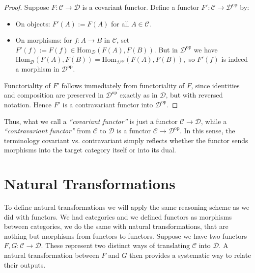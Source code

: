 \begin{proof}
Suppose $F : \mathcal{C} \to \mathcal{D}$ is a covariant functor.  
Define a functor $F' : \mathcal{C} \to \mathcal{D}^{\mathrm{op}}$ by:
\begin{itemize}
  \item On objects: $F'(A) := F(A)$ for all $A \in \mathcal{C}$.
  \item On morphisms: for $f : A \to B$ in $\mathcal{C}$, set
  \(
  F'(f) := F(f) \in \mathrm{Hom}_{\mathcal{D}}(F(A),F(B)).
  \)
  But in $\mathcal{D}^{\mathrm{op}}$ we have
  \(
  \mathrm{Hom}_{\mathcal{D}}(F(A),F(B)) = \mathrm{Hom}_{\mathcal{D}^{\mathrm{op}}}(F(A),F(B)),
  \)
  so $F'(f)$ is indeed a morphism in $\mathcal{D}^{\mathrm{op}}$.
\end{itemize}
Functoriality of $F'$ follows immediately from functoriality of $F$, since identities and composition are preserved in $\mathcal{D}^{\mathrm{op}}$ exactly as in $\mathcal{D}$, but with reversed notation. Hence $F'$ is a contravariant functor into $\mathcal{D}^{\mathrm{op}}$. 
\end{proof}

\begin{remark}
Thus, what we  call a \textit{``covariant functor''} is just a functor 
$\mathcal{C} \to \mathcal{D}$, while a \textit{``contravariant functor''} from $\mathcal{C}$ to $\mathcal{D}$ is a functor
$\mathcal{C} \to \mathcal{D}^{\mathrm{op}}$. 
In this sense, the terminology covariant vs. contravariant simply reflects whether the functor sends morphisms into the target category itself or into its dual.
\end{remark}

\section{\centering Natural Transformations}
To define natural transformations we will apply the same reasoning scheme as we did
with functors. We had categories and we defined functors as morphisms between
categories, we do the same with natural transformations, that are nothing
but morphisms from functors to functors.
Suppose we have two functors $F, G : \mathcal{C} \to \mathcal{D}$. 
These represent two distinct ways of translating $\mathcal{C}$ into $\mathcal{D}$. 
A natural transformation between $F$ and $G$ then provides a systematic way 
to relate their outputs.

